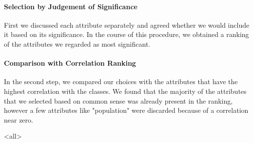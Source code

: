 \paragraph{Selection by Judgement of Significance}
First we discussed each attribute separately and agreed whether we
would include it based on its significance. In the course of this
procedure, we obtained a ranking of the attributes we regarded as most
significant.

\paragraph{Comparison with Correlation Ranking}
In the second step, we compared our choices with the attributes that
have the highest correlation with the classes. We found that the
majority of the attributes that we selected based on common sense was
already present in the ranking, however a few attributes like
"population" were discarded because of a correlation near zero.


\mode<all>